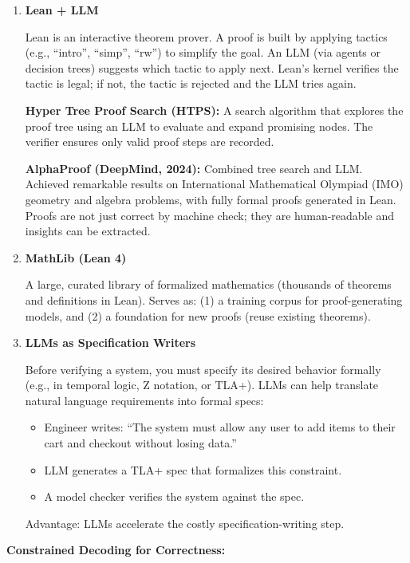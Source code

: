 \begin{enumerate}
    \item \textbf{Lean + LLM}

    Lean is an interactive theorem prover. A proof is built by applying tactics (e.g., ``intro'', ``simp'', ``rw'') to simplify the goal. An LLM (via agents or decision trees) suggests which tactic to apply next. Lean's kernel verifies the tactic is legal; if not, the tactic is rejected and the LLM tries again.

    \textbf{Hyper Tree Proof Search (HTPS):} A search algorithm that explores the proof tree using an LLM to evaluate and expand promising nodes. The verifier ensures only valid proof steps are recorded.

    \textbf{AlphaProof (DeepMind, 2024):} Combined tree search and LLM. Achieved remarkable results on International Mathematical Olympiad (IMO) geometry and algebra problems, with fully formal proofs generated in Lean. Proofs are not just correct by machine check; they are human-readable and insights can be extracted.

    \item \textbf{MathLib (Lean 4)}

    A large, curated library of formalized mathematics (thousands of theorems and definitions in Lean). Serves as: (1) a training corpus for proof-generating models, and (2) a foundation for new proofs (reuse existing theorems).

    \item \textbf{LLMs as Specification Writers}

    Before verifying a system, you must specify its desired behavior formally (e.g., in temporal logic, Z notation, or TLA+). LLMs can help translate natural language requirements into formal specs:
    \begin{itemize}
        \item Engineer writes: ``The system must allow any user to add items to their cart and checkout without losing data.''
        \item LLM generates a TLA+ spec that formalizes this constraint.
        \item A model checker verifies the system against the spec.
    \end{itemize}
    Advantage: LLMs accelerate the costly specification-writing step.
\end{enumerate}

\textbf{Constrained Decoding for Correctness:}

